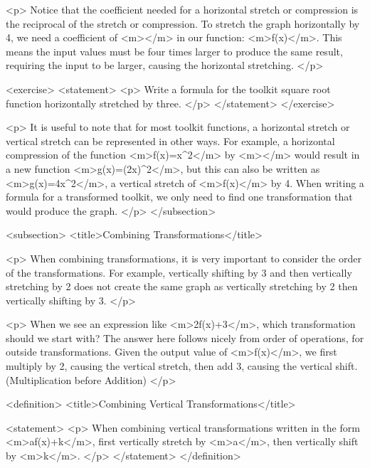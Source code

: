         <p>
            Notice that the coefficient needed for a horizontal stretch or compression is the reciprocal of the stretch or compression.
            To stretch the graph horizontally by 4, we need a coefficient of <m></m> in our function: <m>f(x)</m>.
            This means the input values must be four times larger to produce the same result, requiring the input to be larger, causing the horizontal stretching.
        </p>

        <exercise>
            <statement>
                <p>
                    Write a formula for the toolkit square root function horizontally stretched by three.
                </p>
            </statement>
        </exercise>

        <p>
            It is useful to note that for most toolkit functions, a horizontal stretch or vertical stretch can be represented in other ways.
            For example, a horizontal compression of the function <m>f(x)=x^{2}</m> by <m></m> would result in a new function <m>g(x)=(2x)^{2}</m>, but this can also be written as <m>g(x)=4x^{2}</m>, a vertical stretch of <m>f(x)</m> by 4.
            When writing a formula for a transformed toolkit, we only need to find one transformation that would produce the graph.
        </p>
    </subsection>


    <subsection>
        <title>Combining Transformations</title>

        <p>
            When combining transformations, it is very important to consider the order of the transformations.
            For example, vertically shifting by 3 and then vertically stretching by 2 does not create the same graph as vertically stretching by 2 then vertically shifting by 3.
        </p>

        <p>
            When we see an expression like <m>2f(x)+3</m>, which transformation should we start with? The answer here follows nicely from order of operations, for outside transformations.
            Given the output value of <m>f(x)</m>, we first multiply by 2, causing the vertical stretch, then add 3, causing the vertical shift.
            (Multiplication before Addition)
        </p>

        <definition>
            <title>Combining Vertical Transformations</title>

            <statement>
                <p>
                    When combining vertical transformations written in the form <m>af(x)+k</m>, first vertically stretch by <m>a</m>, then vertically shift by <m>k</m>.
                </p>
            </statement>
        </definition>

